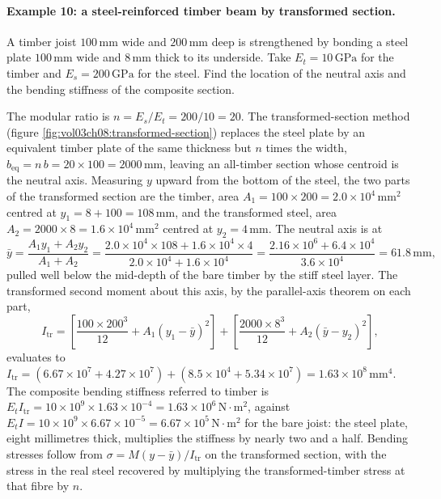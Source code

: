 \paragraph{Example 10: a steel-reinforced timber beam by transformed
section.} A timber joist $100\,\si{\milli\meter}$ wide and
$200\,\si{\milli\meter}$ deep is strengthened by bonding a steel plate
$100\,\si{\milli\meter}$ wide and $8\,\si{\milli\meter}$ thick to its
underside. Take $E_t = 10\,\text{GPa}$ for the timber and $E_s =
200\,\text{GPa}$ for the steel. Find the location of the neutral axis
and the bending stiffness of the composite section.

The modular ratio is $n = E_s/E_t = 200/10 = 20$. The
transformed-section method (figure
\ref{fig:vol03ch08:transformed-section}) replaces the steel plate by an
equivalent timber plate of the same thickness but $n$ times the width,
$b_{\text{eq}} = n\,b = 20 \times 100 = 2000\,\si{\milli\meter}$,
leaving an all-timber section whose centroid is the neutral axis.
Measuring $y$ upward from the bottom of the steel, the two parts of the
transformed section are the timber, area $A_1 = 100 \times 200 = 2.0
\times 10^4\,\si{\milli\meter\squared}$ centred at $y_1 = 8 + 100 =
108\,\si{\milli\meter}$, and the transformed steel, area $A_2 = 2000
\times 8 = 1.6 \times 10^4\,\si{\milli\meter\squared}$ centred at $y_2 =
4\,\si{\milli\meter}$. The neutral axis is at
\[
\bar{y} = \frac{A_1 y_1 + A_2 y_2}{A_1 + A_2}
= \frac{2.0\times 10^4 \times 108 + 1.6\times 10^4 \times 4}
{2.0\times 10^4 + 1.6\times 10^4}
= \frac{2.16\times 10^6 + 6.4\times 10^4}{3.6\times 10^4}
= 61.8\,\si{\milli\meter},
\]
pulled well below the mid-depth of the bare timber by the stiff steel
layer. The transformed second moment about this axis, by the
parallel-axis theorem on each part,
\[
I_{\text{tr}} = \left[\frac{100 \times 200^3}{12} + A_1 (y_1 - \bar{y})^2
\right]
+ \left[\frac{2000 \times 8^3}{12} + A_2 (\bar{y} - y_2)^2\right],
\]
evaluates to $I_{\text{tr}} = (6.67\times 10^7 + 4.27\times 10^7) +
(8.5\times 10^4 + 5.34\times 10^7) = 1.63 \times 10^8\,\si{\milli\meter
\tothe{4}}$. The composite bending stiffness referred to timber is
$E_t I_{\text{tr}} = 10 \times 10^9 \times 1.63 \times 10^{-4} = 1.63
\times 10^6\,\text{N}\cdot\si{\meter\squared}$, against $E_t I = 10
\times 10^9 \times 6.67\times 10^{-5} = 6.67 \times 10^5\,\text{N}\cdot
\si{\meter\squared}$ for the bare joist: the steel plate, eight
millimetres thick, multiplies the stiffness by nearly two and a half.
Bending stresses follow from $\sigma = M(y-\bar{y})/I_{\text{tr}}$ on
the transformed section, with the stress in the real steel recovered by
multiplying the transformed-timber stress at that fibre by $n$.

